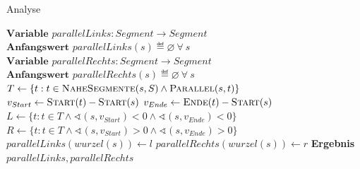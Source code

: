 \documentclass[../main/thesis.tex]{subfiles}
\begin{document}
\begin{algorithmhere}{Analyse}
\label{alg:Analyse}
\begin{algorithmic}
\State $\textbf{Variable } parallelLinks : Segment \rightarrow Segment$
\State $\textbf{Anfangswert } parallelLinks(s) \eqdef \varnothing\ \forall\ s$
\State $\textbf{Variable } parallelRechts : Segment \rightarrow Segment$
\State $\textbf{Anfangswert } parallelRechts(s) \eqdef \varnothing\ \forall\ s$
		\State $T \gets \{t : t \in \textproc{NaheSegmente}(s, S) \wedge \textproc{Parallel}(s, t)\}$  %
		\State $v_{Start} \gets \textproc{Start}(t) - \textproc{Start}(s)$
		\State $v_{Ende} \gets \textproc{Ende}(t) - \textproc{Start}(s)$
		\State $L \gets \{t : t \in T \wedge \sphericalangle (s, v_{Start}) < 0 \wedge \sphericalangle (s, v_{Ende}) < 0\}$
		\State $R \gets \{t : t \in T \wedge \sphericalangle (s, v_{Start}) > 0 \wedge \sphericalangle (s, v_{Ende}) > 0\}$
		\State{}
		\State{}
				\State $parallelLinks(wurzel(s)) \gets l$
			\EndIf
		\EndFor
				\State $parallelRechts(wurzel(s)) \gets r$
			\EndIf
		\EndFor
	\EndFor
	\State \textbf{Ergebnis} $parallelLinks, parallelRechts$
\EndFunction
\end{algorithmic}
\end{algorithmhere}


\end{document}
